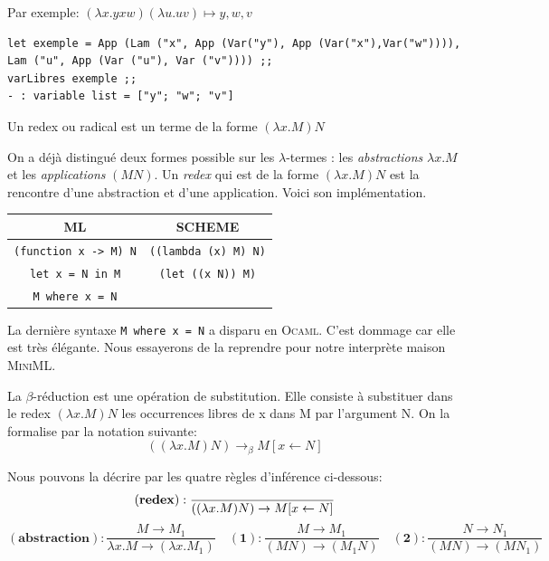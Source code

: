 Par exemple: $(\lambda x.yxw)(\lambda u.uv) \longmapsto  y,w,v $

\begin{Verbatim}
let exemple = App (Lam ("x", App (Var("y"), App (Var("x"),Var("w")))),
Lam ("u", App (Var ("u"), Var ("v")))) ;;
varLibres exemple ;;
- : variable list = ["y"; "w"; "v"]
\end{Verbatim}


\begin{definition}
Un redex ou radical est un terme de la forme $(\lambda x.M)N$
\end{definition}
On a déjà distingué deux formes possible sur les $\lambda$-termes : les \textit{abstractions} $\lambda x.M$ et les
\textit{applications} $(M N)$. Un \textit{redex} qui est de la forme $(\lambda x.M)N$ est la
rencontre d'une abstraction et d'une application. Voici son implémentation.


\vspace{0.5cm}
\begin{center}
\begin{tabular}{c | c} \hline
ML & SCHEME \\ \hline
\texttt{(function x -> M) N} &  \texttt{((lambda (x) M) N)} \\ 
\texttt{let x = N in M} & \texttt{(let ((x N)) M)} \\ 
\texttt{M where x = N} &  \\ 
\end{tabular}
\end{center}
La dernière syntaxe \texttt{M where x = N} a disparu en \textsc{Ocaml}. C'est dommage car elle est très élégante.
Nous essayerons de la reprendre pour notre interprète maison \textsc{MiniML}.

\begin{definition}
La $\beta $-r\'{e}duction est une op\'{e}ration de substitution. Elle consiste \`{a} substituer dans le redex
$(\lambda x.M) N$ les occurrences libres de x dans M par l'argument N.
On la formalise par la notation suivante:
$$
((\lambda x.M) N) \rightarrow _\beta M[x \leftarrow N]
$$
\end{definition}



Nous pouvons la décrire par les quatre règles d'inférence ci-dessous:
$$
\mathbf{(redex)} : \frac{}{((\lambda x.M)N) \rightarrow M[x \leftarrow N]} \\
$$
$$
\mathbf{(abstraction)} : \frac{M \rightarrow M_1}{ \lambda x.M \rightarrow (\lambda x.M_1)}
\quad \mathbf{(1)} : \frac{M \rightarrow M_1}{(M N) \rightarrow (M_1 N)}
\quad \mathbf{(2)} : \frac{N \rightarrow N_1}{(M N) \rightarrow (M N_1)}
$$

